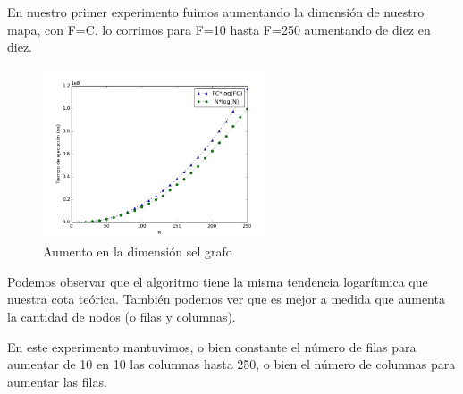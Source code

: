 \documentclass[spanish,12pt]{article}
\begin{document}
En nuestro primer experimento fuimos aumentando la dimensión de nuestro mapa, con F=C. lo corrimos para F=10 hasta F=250 aumentando de diez en diez.

\begin{figure}[H]
\centering
\includegraphics[width=0.6\textwidth]{sinParedes}
\caption{Aumento en la dimensión sel grafo}
\end{figure}

Podemos observar que el algoritmo tiene la misma tendencia logarítmica que nuestra cota teórica. También podemos ver que es mejor a medida que aumenta la cantidad de nodos (o filas y columnas).


En este experimento mantuvimos, o bien constante el número de filas para aumentar de 10 en 10 las columnas hasta 250, o bien el número de columnas para aumentar las filas.
\end{document}
